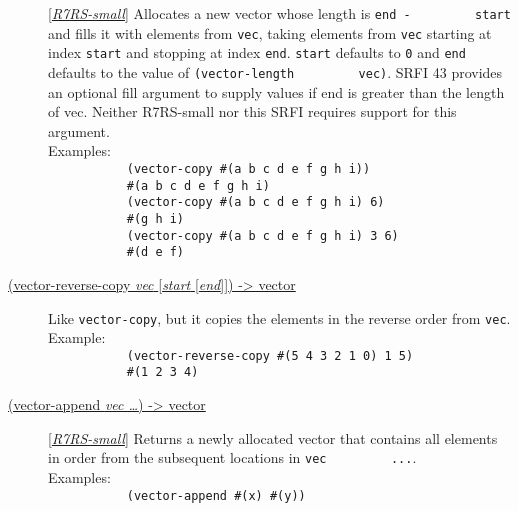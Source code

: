 \begin{description}
{[}\protect\hyperlink{R7RS-small}{\emph{R7RS-small}}{]} Allocates a new
vector whose length is \texttt{end\ -\ \ \ \ \ \ \ \ \ start} and fills
it with elements from \texttt{vec}, taking elements from \texttt{vec}
starting at index \texttt{start} and stopping at index \texttt{end}.
\texttt{start} defaults to \texttt{0} and \texttt{end} defaults to the
value of \texttt{(vector-length\ \ \ \ \ \ \ \ \ vec)}. SRFI 43 provides
an optional fill argument to supply values if end is greater than the
length of vec. Neither R7RS-small nor this SRFI requires support for
this
argument.\\[2\baselineskip]Examples:\\[2\baselineskip]\texttt{\ \ \ \ \ \ \ \ \ \ \ (vector-copy\ \textquotesingle{}\#(a\ b\ c\ d\ e\ f\ g\ h\ i))\ \ \ \ \ \ \ \ \ }\\
\texttt{\ \ \ \ \ \ \ \ \ \ \ \#(a\ b\ c\ d\ e\ f\ g\ h\ i)\ \ \ \ \ \ \ \ \ }\\[2\baselineskip]\texttt{\ \ \ \ \ \ \ \ \ \ \ (vector-copy\ \textquotesingle{}\#(a\ b\ c\ d\ e\ f\ g\ h\ i)\ 6)\ \ \ \ \ \ \ \ \ }\\
\texttt{\ \ \ \ \ \ \ \ \ \ \ \#(g\ h\ i)\ \ \ \ \ \ \ \ \ }\\[2\baselineskip]\texttt{\ \ \ \ \ \ \ \ \ \ \ (vector-copy\ \textquotesingle{}\#(a\ b\ c\ d\ e\ f\ g\ h\ i)\ 3\ 6)\ \ \ \ \ \ \ \ \ }\\
\texttt{\ \ \ \ \ \ \ \ \ \ \ \#(d\ e\ f)\ \ \ \ \ \ \ \ \ }\\[2\baselineskip]
\item[ \href{}{(vector-reverse-copy \emph{vec} {[}\emph{start}
{[}\emph{end}{]}{]}) -\textgreater{} vector} ]
Like \texttt{vector-copy}, but it copies the elements in the reverse
order from
\texttt{vec}.\\[2\baselineskip]Example:\\[2\baselineskip]\texttt{\ \ \ \ \ \ \ \ \ \ \ (vector-reverse-copy\ \textquotesingle{}\#(5\ 4\ 3\ 2\ 1\ 0)\ 1\ 5)\ \ \ \ \ \ \ \ \ }\\
\texttt{\ \ \ \ \ \ \ \ \ \ \ \#(1\ 2\ 3\ 4)\ \ \ \ \ \ \ \ \ }\\[2\baselineskip]
\item[ \href{}{(vector-append \emph{vec \ldots{}}) -\textgreater{}
vector} ]
{[}\protect\hyperlink{R7RS-small}{\emph{R7RS-small}}{]} Returns a newly
allocated vector that contains all elements in order from the subsequent
locations in
\texttt{vec\ \ \ \ \ \ \ \ \ ...}.\\[2\baselineskip]Examples:\\[2\baselineskip]\texttt{\ \ \ \ \ \ \ \ \ \ \ (vector-append\ \textquotesingle{}\#(x)\ \textquotesingle{}\#(y))\ \ \ \ \ \ \ \ \ }\\

\end{description}
